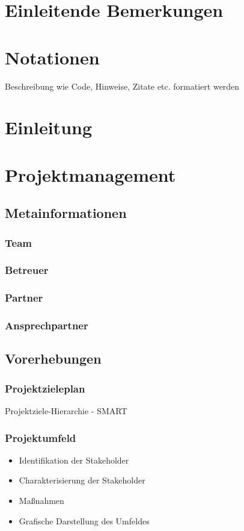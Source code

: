 \def \currentAuthor {} %

\chapter*{Einleitende Bemerkungen}

\chapter*{Notationen}
Beschreibung wie Code, Hinweise, Zitate etc. formatiert werden  

\chapter{Einleitung}

\chapter{Projektmanagement}

\section{Metainformationen}
\subsection{Team}
\subsection{Betreuer}
\subsection{Partner}
\subsection{Ansprechpartner}
\section{Vorerhebungen}
\subsection{Projektzieleplan}
Projektziele-Hierarchie - SMART
\subsection{Projektumfeld}
\begin{itemize}
	\item Identifikation der Stakeholder
	\item Charakterisierung der Stakeholder
	\item Maßnahmen
	\item Grafische Darstellung des Umfeldes
\end{itemize}
